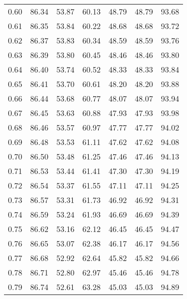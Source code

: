 \begin{tabular}{|c|c|c|c|c|c|c|}
      0.60 &     86.34 &     53.87 &      60.13 &   48.79 &      48.79 &         93.68 \\
      0.61 &     86.35 &     53.84 &      60.22 &   48.68 &      48.68 &         93.72 \\
      0.62 &     86.37 &     53.83 &      60.34 &   48.59 &      48.59 &         93.76 \\
      0.63 &     86.39 &     53.80 &      60.45 &   48.46 &      48.46 &         93.80 \\
      0.64 &     86.40 &     53.74 &      60.52 &   48.33 &      48.33 &         93.84 \\
      0.65 &     86.41 &     53.70 &      60.61 &   48.20 &      48.20 &         93.88 \\
      0.66 &     86.44 &     53.68 &      60.77 &   48.07 &      48.07 &         93.94 \\
      0.67 &     86.45 &     53.63 &      60.88 &   47.93 &      47.93 &         93.98 \\
      0.68 &     86.46 &     53.57 &      60.97 &   47.77 &      47.77 &         94.02 \\
      0.69 &     86.48 &     53.53 &      61.11 &   47.62 &      47.62 &         94.08 \\
      0.70 &     86.50 &     53.48 &      61.25 &   47.46 &      47.46 &         94.13 \\
      0.71 &     86.53 &     53.44 &      61.41 &   47.30 &      47.30 &         94.19 \\
      0.72 &     86.54 &     53.37 &      61.55 &   47.11 &      47.11 &         94.25 \\
      0.73 &     86.57 &     53.31 &      61.73 &   46.92 &      46.92 &         94.31 \\
      0.74 &     86.59 &     53.24 &      61.93 &   46.69 &      46.69 &         94.39 \\
      0.75 &     86.62 &     53.16 &      62.12 &   46.45 &      46.45 &         94.47 \\
      0.76 &     86.65 &     53.07 &      62.38 &   46.17 &      46.17 &         94.56 \\
      0.77 &     86.68 &     52.92 &      62.64 &   45.82 &      45.82 &         94.66 \\
      0.78 &     86.71 &     52.80 &      62.97 &   45.46 &      45.46 &         94.78 \\
      0.79 &     86.74 &     52.61 &      63.28 &   45.03 &      45.03 &         94.89 \\

\end{tabular}
